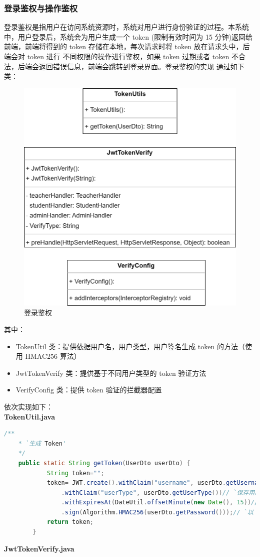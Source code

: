 \documentclass[12pt, a4paper]{article}
\begin{document}
\subsubsection{登录鉴权与操作鉴权}
登录鉴权是指用户在访问系统资源时，系统对用户进行身份验证的过程。本系统中，用户登录后，系统会为用户生成一个 token
(限制有效时间为 15 分钟)返回给前端，前端将得到的 token 存储在本地，每次请求时将 token 放在请求头中，后端会对 token 进行
不同权限的操作进行鉴权，如果 token 过期或者 token 不合法，后端会返回错误信息，前端会跳转到登录界面。登录鉴权的实现
通过如下类：
\begin{figure}[H]
	\centering
	\includegraphics[width = 0.5 \textwidth]{loginVerify.png}
	\caption{登录鉴权}
\end{figure}
其中：
\begin{itemize}
	\item TokenUtil 类：提供依据用户名，用户类型，用户签名生成 token 的方法（使用 HMAC256 算法）
	\item JwtTokenVerify 类：提供基于不同用户类型的 token 验证方法
	\item VerifyConfig 类：提供 token 验证的拦截器配置
\end{itemize}
依次实现如下：\\
\textbf{TokenUtil.java}
\begin{lstlisting}[language=Java]
	/**
	* `生成 Token'
	*/
	public static String getToken(UserDto userDto) {
			String token="";
			token= JWT.create().withClaim("username", userDto.getUsername())// `保存用户信息'
				.withClaim("userType", userDto.getUserType())// `保存用户信息'
				.withExpiresAt(DateUtil.offsetMinute(new Date(), 15))// `设置过期时间为 15 分钟'
				.sign(Algorithm.HMAC256(userDto.getPassword()));// `以 password 作为 token 的密钥'
			return token;
		}
\end{lstlisting}
\textbf{JwtTokenVerify.java}
\end{document}
